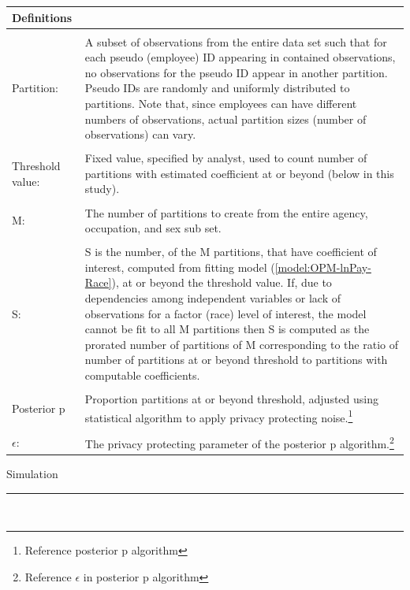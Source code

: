 \documentclass[10pt, letterpaper]{article}
\begin{document}
\begin{spacing}{1.0}
\begin{table}
    \begin{tabular}{p{1in}p{5in}}
    Definitions & \\
    \hline
    & \\    
    Partition: &  A subset of observations from the entire data set such that for each pseudo (employee) ID appearing in contained observations, no observations for the pseudo ID appear in another partition.  Pseudo IDs are randomly and uniformly distributed to partitions.  Note that, since employees can have different numbers of observations, actual partition sizes (number of observations) can vary.\\
    & \\[-6pt]
    Threshold value: & Fixed value, specified by analyst, used to count number of partitions with estimated coefficient at or beyond (below in this study).\\
    & \\[-6pt]
    M: & The number of partitions to create from the entire agency, occupation, and sex sub set.\\
    & \\[-6pt]
    S: & S is the number, of the M partitions, that have coefficient of interest, computed from fitting model (\ref{model:OPM-lnPay-Race}), at or beyond the threshold value.  If, due to dependencies among independent variables or lack of observations for a factor (race) level of interest, the model cannot be fit to all M partitions then S is computed as the prorated number of partitions of M corresponding to the ratio of number of partitions at or beyond threshold to partitions with computable coefficients.\\
    & \\[-6pt]
    Posterior p & Proportion partitions at or beyond threshold, adjusted using statistical algorithm to apply privacy protecting noise.\footnote{Reference posterior p algorithm}\\
    & \\[-6pt]
    $\epsilon$: & The privacy protecting parameter of the posterior p algorithm.\footnote{Reference $\epsilon$ in posterior p algorithm}\\
    
    \end{tabular}
\end{table}

\vspace{20pt}

Simulation\\[-8pt]
\noindent\rule{\textwidth}{0.5pt}\\[-6.25pt]


\end{spacing}
\end{document}
